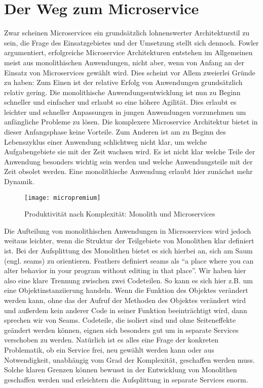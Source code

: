 \section{Der Weg zum Microservice}
Zwar scheinen Microservices ein grundsätzlich lohnenswerter Architekturstil zu sein, die Frage des Einsatzgebietes und der Umsetzung stellt sich dennoch. Fowler argumentiert\cite[][]{fowler:monolithfirst}, erfolgreiche Microservice Architekturen entstehen im Allgemeinen meist aus monolithischen Anwendungen, nicht aber, wenn von Anfang an der Einsatz von Microservices gewählt wird. Dies scheint vor Allem zweierlei Gründe zu haben: Zum Einen ist der relative Erfolg von Anwendungen grundsätzlich relativ gering. Die monolithische Anwendungsentwicklung ist nun zu Beginn schneller und einfacher und erlaubt so eine höhere Agilität. Dies erlaubt es leichter und schneller Anpassungen in jungen Anwendungen vorzunehmen um anfängliche Probleme zu lösen. Die komplexere Microservice Architektur bietet in dieser Anfangsphase keine Vorteile. Zum Anderen ist am zu Beginn des Lebenszyklus einer Anwendung schlichtweg nicht klar, um welche Aufgabengebiete sie mit der Zeit wachsen wird. Es ist nicht klar welche Teile der Anwendung besonders wichtig sein werden und welche Anwendungsteile mit der Zeit obsolet werden. Eine monolithische Anwendung erlaubt hier zunächst mehr Dynamik.

\begin{figure}[!ht]
    \caption{Produktivität nach Komplexität: Monolith und Microservices \cite{fowler:micropremium}}
    \centering
    \label{fig:micrpremium}
    \texttt{[image: micropremium]}
\end{figure}

Die Aufteilung von monolithischen Anwendungen in Micrsoservices wird jedoch weitaus leichter, wenn die Struktur der Teilgebiete von Monolithen klar definiert ist. Bei der Aufsplittung des Monolithen bietet es sich hierbei an, sich am Saum (engl. seams) zu orientieren. Feathers definiert seams als ``a place where you can alter behavior in your program without editing in that place''.\cite[][Seite 29]{feathers2004working} Wir haben hier also eine klare Trennung zwischen zwei Codeteilen. So kann es sich hier z.B. um eine Objektinstanziierung handeln. Wenn die Funktion des Objektes verändert werden kann, ohne das der Aufruf der Methoden des Objektes verändert wird und außerdem kein anderer Code in seiner Funktion beeinträchtigt wird, dann sprechen wir von Seams. Codeteile, die isoliert sind und ohne Seiteneffekte geändert werden können, eignen sich besonders gut um in separate Services verschoben zu werden. Natürlich ist es alles eine Frage der konkreten Problematik, ob ein Service frei, neu gewählt werden kann oder aus Notwendigkeit, unabhängig vom Grad der Komplexität, geschaffen werden muss. Solche klaren Grenzen können bewusst in der Entwicklung von Monolithen geschaffen werden und erleichtern die Aufsplittung in separate Services enorm.


